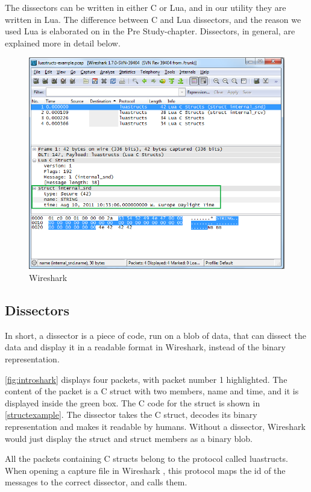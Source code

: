 The dissectors can be written in either C or Lua, and in our utility they are written in Lua.
The difference between C and Lua dissectors, and the reason we used Lua is elaborated on in the Pre Study-chapter.
Dissectors, in general, are explained more in detail below.

\begin{figure}[ht]
	\includegraphics[width=\textwidth]{./img/wireshark_example.png}
	\caption{Wireshark\label{fig:introshark}}
\end{figure}

\subsection*{Dissectors}
In short, a dissector is a piece of code, run on a blob of data, that can dissect the
data and display it in a readable format in Wireshark, instead of the binary representation.

\autoref{fig:introshark} displays four packets, with packet number 1 highlighted.
The content of the packet is a C struct with two members, name and time, and it is displayed inside the green box.
The C code for the struct is shown in \autoref{structexample}.
The dissector takes the C struct, decodes its binary representation and makes it readable by humans.
Without a dissector, Wireshark would just display the struct and struct members as a binary blob.

All the packets containing C structs belong to the protocol called luastructs.
When opening a capture file in Wireshark , this protocol maps the id of the messages to the correct dissector,
and calls them.

